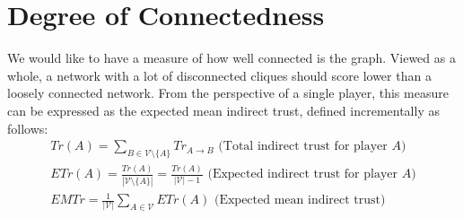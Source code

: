 \section{Degree of Connectedness}
  We would like to have a measure of how well connected is the graph. Viewed as a whole, a network with a lot of disconnected
  cliques should score lower than a loosely connected network. From the perspective of a single player, this measure can be
  expressed as the expected mean indirect trust, defined incrementally as follows:
  \begin{gather*}
    Tr(A) = \sum\limits_{B \in \mathcal{V} \setminus \{A\}}Tr_{A \rightarrow B} \mbox{ (Total indirect trust for player
    }A\mbox{)} \\
    ETr\left(A\right) = \frac{Tr(A)}{|\mathcal{V} \setminus \{A\}|} = \frac{Tr(A)}{|\mathcal{V}| - 1} \mbox{ (Expected
    indirect trust for player }A\mbox{)} \\
    EMTr = \frac{1}{|\mathcal{V}|}\sum\limits_{A \in \mathcal{V}}ETr\left(A\right) \mbox{ (Expected mean indirect trust)}
  \end{gather*}
